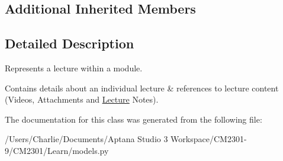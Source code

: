 \subsection*{Additional Inherited Members}


\subsection{Detailed Description}
Represents a lecture within a module. 

Contains details about an individual lecture \& references to lecture content (Videos, Attachments and \hyperlink{class_learn_1_1models_1_1_lecture}{Lecture} Notes). 

The documentation for this class was generated from the following file\-:\begin{DoxyCompactItemize}
\item 
/\-Users/\-Charlie/\-Documents/\-Aptana Studio 3 Workspace/\-C\-M2301-\/9/\-C\-M2301/\-Learn/models.\-py\end{DoxyCompactItemize}
